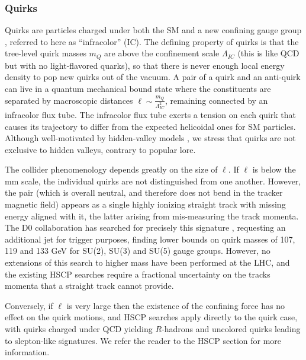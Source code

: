 \subsubsection*{Quirks}

Quirks are particles charged under both the SM and a new confining gauge group \cite{Kang:2008ea}, referred to here as ``infracolor'' (IC). The defining property of quirks is that the tree-level quirk masses $m_Q$ are above the confinement scale $\Lambda_{IC}$ (this is like QCD but with no light-flavored quarks), so that there is never enough local energy density to pop new quirks out of the vacuum.  A pair of a quirk and an anti-quirk can live in a quantum mechanical bound state where the constituents are separated by macroscopic distances $\ell \sim \frac{m_Q}{\Lambda_{IC}^2}$, remaining connected by an infracolor flux tube. The infracolor flux tube exerts a tension on each quirk that causes its trajectory to differ from the expected helicoidal ones for SM particles. Although well-motivated by hidden-valley models \cite{Strassler:2006im}, we stress that quirks are not exclusive to hidden valleys, contrary to popular lore.

The collider phenomenology depends greatly on the size of $\ell$.  If $\ell$ is below the mm scale, the individual quirks are not distinguished from one another. However, the pair (which is overall neutral, and therefore does not bend in the tracker magnetic field) appears as a single highly ionizing straight track with missing energy aligned with it, the latter arising from mis-measuring the track momenta.
The D0 collaboration has searched for precisely this signature \cite{Abazov:2010yb}, requesting an additional jet for trigger purposes, finding lower bounds on quirk masses of 107, 119 and 133 GeV for SU(2), SU(3) and SU(5) gauge groups. However, no extensions of this search to higher mass have been performed at the LHC, and the existing HSCP searches require a fractional uncertainty on the tracks momenta that a straight track cannot provide.

Conversely, if $\ell$ is very large then the existence of the confining force has no effect on the quirk motions, and HSCP searches  apply directly to the quirk case, with quirks charged under QCD yielding $R$-hadrons and uncolored quirks leading to slepton-like signatures. We refer the reader to the HSCP section for more information.

